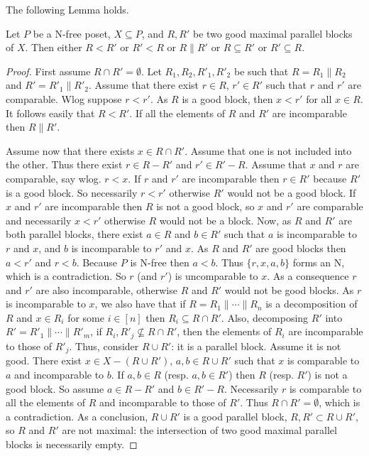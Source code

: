 \documentclass{CSML}
\begin{document}
The following Lemma holds.
\begin{lem}
  \label{lem:compGMPB}
  Let $P$ be a N-free poset, $X\subseteq P$, and $R,R'$ be two good maximal parallel blocks of $X$.
  Then either $R<R'$ or $R'<R$ or $R\parallel R'$ or $R\subseteq R'$ or $R'\subseteq R$.
\end{lem}
\begin{proof}
  First assume $R\cap R'=\emptyset$. Let $R_1,R_2,R'_1,R'_2$ be such that $R=R_1\parallel R_2$ and $R'=R'_1\parallel R'_2$. Assume that there exist $r\in R$, $r'\in R'$ such that $r$ and $r'$ are comparable. Wlog suppose $r<r'$. As $R$ is a good block, then $x<r'$ for all $x\in R$. It follows easily that $R<R'$. If all the elements of $R$ and $R'$ are incomparable then $R\parallel R'$.

  Assume now that there exists $x\in R\cap R'$. Assume that 
one is not included into the other. Thus there exist $r\in R-R'$ and $r'\in R'-R$. Assume that $x$ and $r$ are comparable, say wlog. $r<x$. If $r$ and $r'$ are incomparable then $r\in R'$ because $R'$ is a good block. So necessarily $r<r'$ otherwise $R'$ would not be a good block. If $x$ and $r'$ are incomparable then $R$ is not a good block, so $x$ and $r'$ are comparable and necessarily $x<r'$ otherwise $R$ would not be a block. Now, as $R$ and $R'$ are both parallel blocks, there exist $a\in R$ and $b\in R'$ such that $a$ is incomparable to $r$ and $x$, and $b$ is incomparable to $r'$ and $x$. As $R$ and $R'$ are good blocks then $a<r'$ and $r<b$. Because $P$ is N-free then $a<b$. Thus $\{r,x,a,b\}$ forms an N, which is a contradiction. So $r$ (and $r'$) is uncomparable to $x$. As a consequence $r$ and $r'$ are also incomparable, otherwise $R$ and $R'$ would not be good blocks. As $r$ is incomparable to $x$, we also have that if $R=R_1\parallel\cdots\parallel R_n$ is a decomposition of $R$ and $x\in R_i$ for some $i\in[n]$ then $R_i\subseteq R\cap R'$. Also, decomposing $R'$ into $R'=R'_1\parallel\cdots\parallel R'_m$, if $R_i,R'_j\not\subseteq R\cap R'$, then the elements of $R_i$ are incomparable to those of $R'_j$. Thus, consider $R\cup R'$: it is a parallel block. Assume it is not good. There exist $x\in X-(R\cup R')$, $a,b\in R\cup R'$ such that $x$ is comparable to $a$ and incomparable to $b$. If $a,b\in R$ (resp. $a,b\in R'$) then $R$ (resp. $R'$) is not a good block. So assume $a\in R-R'$ and $b\in R'-R$. Necessarily $r$ is comparable to all the elements of $R$ and incomparable to those of $R'$. Thus $R\cap R'=\emptyset$, which is a contradiction. As a conclusion, $R\cup R'$ is a good parallel block, $R,R'\subset R\cup R'$, so $R$ and $R'$ are not maximal: the intersection of two good maximal parallel blocks is necessarily empty.
\end{proof}
\end{document}
